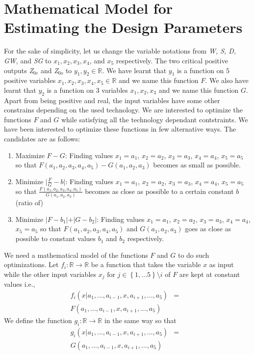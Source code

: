 \documentclass[journal]{IEEEtran}
\begin{document}
\section{Mathematical Model for Estimating the Design Parameters}
For the sake of simplicity, let us change the variable notations from \textit{W, S, D, GW}, and \textit{SG} to $x_1,x_2,x_3,x_4$, and $x_5$ respectively. The two critical positive outputs \textit{Z$_{0e}$} and \textit{Z$_{0o}$} to   $y_1,y_2 \in \mathbb{R}$. We have learnt that $y_1$ is a function on $5$ positive variables $x_1,x_2,x_3,x_4,x_5 \in \mathbb{R}$ and we name this function $F$. We also have learnt that $y_2$ is a function on $3$ variables $x_1,x_2,x_3$ and we name this function $G$. Apart from being positive and real, the input variables have some other constrains depending on the used technology. We are interested to optimize the functions $F$ and $G$ while satisfying all the technology dependant contstraints. We have been interested to optimize these functions in few alternative ways. The candidates are as follows:
\begin{enumerate}
	\item Maximize $F - G$: Finding values $x_1=a_1$, $x_2=a_2$, $x_3=a_3$, $x_4=a_4$, $x_5=a_5$ so that $F(a_1,a_2,a_3,a_4,a_5) - G(a_1,a_2,a_3)$ becomes as small as possible.
	\item Minimize $\vert\frac{F}{G}-b\vert$: Finding values $x_1=a_1$, $x_2=a_2$, $x_3=a_3$, $x_4=a_4$, $x_5=a_5$ so that $\frac{F(a_1,a_2,a_3,a_4,a_5)}{G(a_1,a_2,a_3)}$ becomes as close as possible to a certain constant $b$ (ratio of)
	\item Minimize $\vert F-b_1 \vert + \vert G-b_2 \vert$: Finding values $x_1=a_1$, $x_2=a_2$, $x_3=a_3$, $x_4=a_4$, $x_5=a_5$ so that $F(a_1,a_2,a_3,a_4,a_5)$ and $G(a_1,a_2,a_3)$  goes as close as possible to constant values $b_1$ and $b_2$ respectively.
\end{enumerate}

We need a mathematical model of the functions $F$ and $G$ to do such optimizations. Let $f_i:\mathbb{R} \rightarrow \mathbb{R}$ be a function that takes the variable $x$ as input while the other input variables $x_{j} \text{ for } j \in \left\lbrace1,...5\right\rbrace\setminus{i}$ of $F$ are kept at constant values i.e., 
\begin{eqnarray}
	f_i(x\vert a_1,...,a_{i-1},x,a_{i+1},...,a_{5}) &=& \nonumber \\ 
	F(a_1,...,a_{i-1},x,a_{i+1},...,a_{5})
\end{eqnarray}
We define the function $g_i:\mathbb{R} \rightarrow \mathbb{R}$ in the same way so that 
\begin{eqnarray}
	g_i(x\vert a_1,...,a_{i-1},x,a_{i+1},...,a_{5}) &=& \nonumber \\
	G(a_1,...,a_{i-1},x,a_{i+1},...,a_{5})
\end{eqnarray} 
\end{document}
